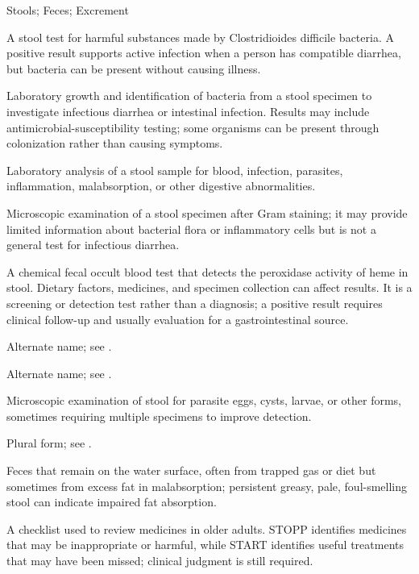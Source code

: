 \synonyms
Stools; Feces; Excrement

 A stool test for harmful substances made by Clostridioides difficile bacteria. A positive result supports active infection when a person has compatible diarrhea, but bacteria can be present without causing illness.

 Laboratory growth and identification of bacteria from a stool specimen to investigate infectious diarrhea or intestinal infection. Results may include antimicrobial-susceptibility testing; some organisms can be present through colonization rather than causing symptoms.

 Laboratory analysis of a stool sample for blood, infection, parasites, inflammation, malabsorption, or other digestive abnormalities.

 Microscopic examination of a stool specimen after Gram staining; it may provide limited information about bacterial flora or inflammatory cells but is not a general test for infectious diarrhea.

 A chemical fecal occult blood test that detects the peroxidase activity of heme in stool. Dietary factors, medicines, and specimen collection can affect results. It is a screening or detection test rather than a diagnosis; a positive result requires clinical follow-up and usually evaluation for a gastrointestinal source.

 Alternate name; see .

 Alternate name; see .

 Microscopic examination of stool for parasite eggs, cysts, larvae, or other forms, sometimes requiring multiple specimens to improve detection.

 Plural form; see .

 Feces that remain on the water surface, often from trapped gas or diet but sometimes from excess fat in malabsorption; persistent greasy, pale, foul-smelling stool can indicate impaired fat absorption.

 A checklist used to review medicines in older adults. STOPP identifies medicines that may be inappropriate or harmful, while START identifies useful treatments that may have been missed; clinical judgment is still required.

